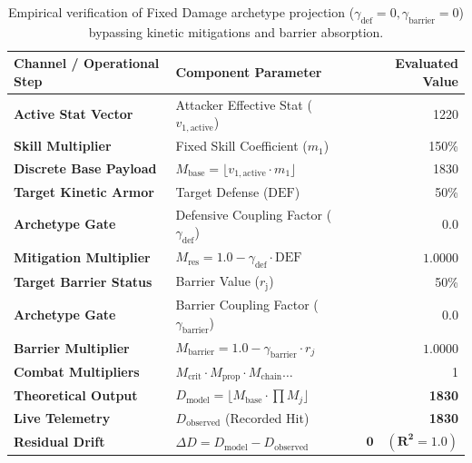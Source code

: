 \documentclass[twocolumn,10pt]{article}
\begin{document}
\begin{table}[H]
\centering
\small
\setlength{\tabcolsep}{5pt}
\begin{tabular}{llr}
\toprule
\textbf{Channel / Operational Step} & \textbf{Component Parameter} & \textbf{Evaluated Value} \\
\midrule
\textbf{Active Stat Vector}     & Attacker Effective Stat ($v_{1,\text{active}}$)    & 1220 \\
\textbf{Skill Multiplier}       & Fixed Skill Coefficient ($m_1$)                     & 150\% \\
\textbf{Discrete Base Payload}  & $M_{\text{base}} = \lfloor v_{1,\text{active}} \cdot m_1 \rfloor$ & 1830 \\
\midrule
\textbf{Target Kinetic Armor}   & Target Defense ($\text{DEF}$)               & 50\% \\
\textbf{Archetype Gate}         & Defensive Coupling Factor ($\gamma_{\text{def}}$) & $0.0$ \\
\textbf{Mitigation Multiplier}  & $M_{\text{res}} = 1.0 - \gamma_{\text{def}} \cdot \text{DEF}$ & $\mathbf{1.0000}$ \\
\midrule
\textbf{Target Barrier Status}  & Barrier Value ($r_{\text{j}}$)       & 50\% \\
\textbf{Archetype Gate}         & Barrier Coupling Factor ($\gamma_{\text{barrier}}$) & $0.0$ \\
\textbf{Barrier Multiplier}           & $M_{\text{barrier}} = 1.0 - \gamma_{\text{barrier}}\cdot r_j$ & $\mathbf{1.0000}$ \\
\midrule
\textbf{Combat Multipliers}     & $M_{\text{crit}} \cdot M_{\text{prop}} \cdot M_{\text{chain}} \dots$ & 1 \\
\midrule\midrule
\textbf{Theoretical Output}     & $D_{\text{model}} = \lfloor M_{\text{base}} \cdot \prod M_j \rfloor$ & \textbf{1830} \\
\textbf{Live Telemetry}         & $D_{\text{observed}}$ (Recorded Hit)               & \textbf{1830} \\
\midrule
\textbf{Residual Drift}         & $\Delta D = D_{\text{model}} - D_{\text{observed}}$ & $\mathbf{0 \quad (R^2 = 1.0)}$ \\
\bottomrule
\end{tabular}
\caption{Empirical verification of Fixed Damage archetype projection ($\gamma_{\text{def}} = 0, \gamma_{\text{barrier}} = 0$) bypassing kinetic mitigations and barrier absorption.}
\label{tab:archetype_fixed_verification}
\end{table}
\end{document}

